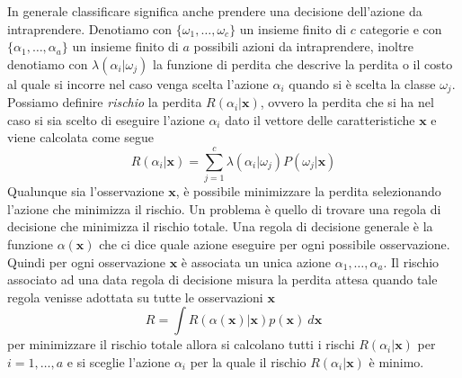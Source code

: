\noindent In generale classificare significa anche prendere una decisione dell'azione da intraprendere. Denotiamo con $\{\omega_1, \dots, \omega_c\}$ un insieme finito di $c$ categorie e con $\{\alpha_1, \dots, \alpha_a\}$ un insieme finito di $a$ possibili azioni da intraprendere, inoltre denotiamo con $\lambda(\alpha_i|\omega_j)$ la funzione di perdita che descrive la perdita o il costo al quale si incorre nel caso venga scelta l'azione $\alpha_i$ quando si è scelta la classe $\omega_j$. Possiamo definire \emph{rischio} la perdita $R(\alpha_i|\mathbf{x})$, ovvero la perdita che si ha nel caso si sia scelto di eseguire l'azione $\alpha_i$ dato il vettore delle caratteristiche $\mathbf{x}$ e viene calcolata come segue
\begin{equation}\label{risk}
R(\alpha_i | \mathbf{x}) = \sum_{j=1}^c \lambda(\alpha_i | \omega_j) P(\omega_j | \mathbf{x})
\end{equation}
Qualunque sia l'osservazione $\mathbf{x}$, è possibile minimizzare la perdita selezionando l'azione che minimizza il rischio. Un problema è quello di trovare una regola di decisione che minimizza il rischio totale. Una regola di decisione generale è la funzione $\alpha(\mathbf{x})$ che ci dice quale azione eseguire per ogni possibile osservazione. Quindi per ogni osservazione $\mathbf{x}$ è associata un unica azione $\alpha_1, \dots, \alpha_a$. Il rischio associato ad una data regola di decisione misura la perdita attesa quando tale regola venisse adottata su tutte le osservazioni $\mathbf{x}$
\begin{equation}
R = \int R(\alpha(\mathbf{x}) | \mathbf{x}) p(\mathbf{x}) \ d\mathbf{x}
\end{equation}
per minimizzare il rischio totale allora si calcolano tutti i rischi $R(\alpha_i | \mathbf{x})$ per $i=1, \dots, a$ e si sceglie l'azione $\alpha_i$ per la quale il rischio $R(\alpha_i | \mathbf{x})$ è minimo.

